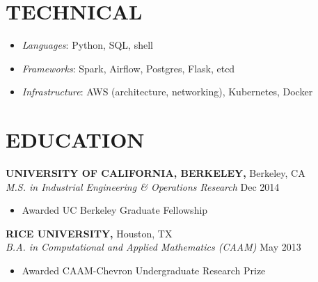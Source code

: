 \documentclass[geomargin]{res}
\begin{document}
\begin{resume}
\section{TECHNICAL}

\begin{itemize}
  \item \textit{Languages}: Python, SQL, shell
  \item \textit{Frameworks}: Spark, Airflow, Postgres, Flask, etcd
  \item \textit{Infrastructure}: AWS (architecture, networking), Kubernetes, Docker
\end{itemize}


\section{EDUCATION}
{\bf UNIVERSITY OF CALIFORNIA, BERKELEY,} Berkeley, CA \\
{\em M.S. in Industrial Engineering \& Operations Research }
\hfill Dec 2014\\                                     \vspace{-4mm}
\begin{itemize}
  \item Awarded UC Berkeley Graduate Fellowship
\end{itemize}
\vspace{-1mm}

{\bf RICE UNIVERSITY,} Houston, TX \\
{\em B.A. in Computational and Applied Mathematics (CAAM)}
\hfill May 2013\\                                     \vspace{-4mm}
\begin{itemize}                                         \itemsep1pt
  \item Awarded CAAM-Chevron Undergraduate Research Prize
\end{itemize}
\vspace{-1mm}



\end{resume}
\end{document}
